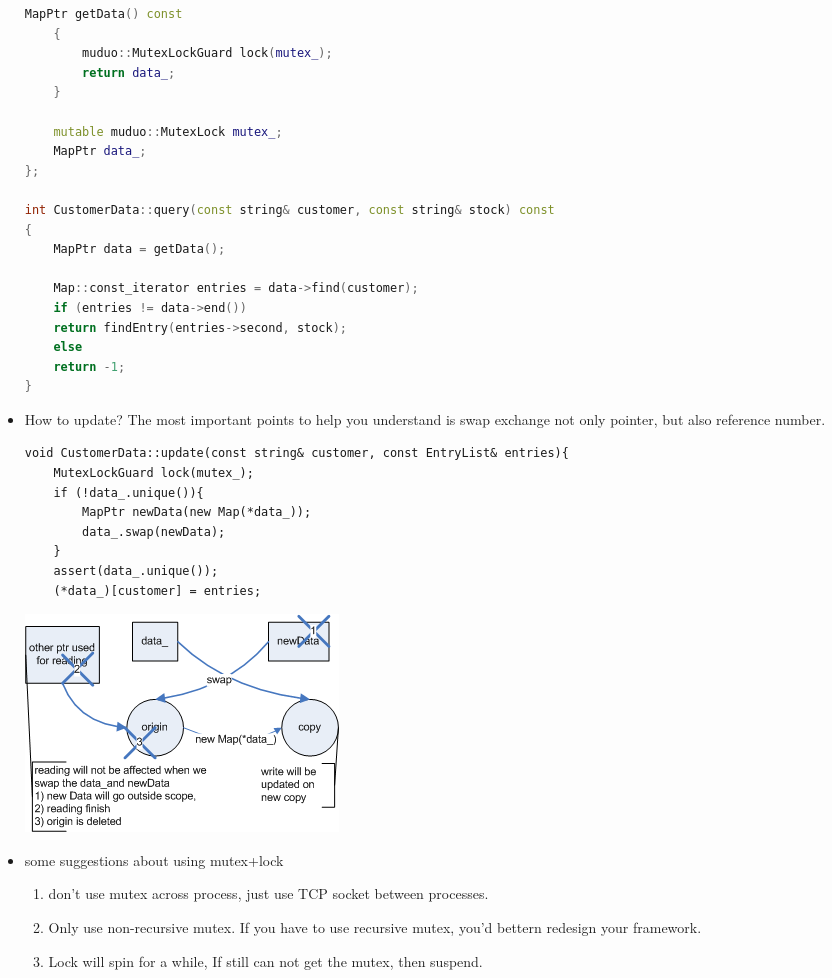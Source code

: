 \documentclass[a4paper,11pt,twoside]{book}
\begin{document}
\begin{itemize}
\begin{lstlisting}[frame=single, language=c++]
	MapPtr getData() const
	{
		muduo::MutexLockGuard lock(mutex_);
		return data_;
	}
	
	mutable muduo::MutexLock mutex_;
	MapPtr data_;
};

int CustomerData::query(const string& customer, const string& stock) const
{
	MapPtr data = getData();
	
	Map::const_iterator entries = data->find(customer);
	if (entries != data->end())
	return findEntry(entries->second, stock);
	else
	return -1;
}
\end{lstlisting}

\item How to update? The most important points to help you understand is swap exchange not only pointer, but also reference number. 
\begin{lstlisting}
void CustomerData::update(const string& customer, const EntryList& entries){
    MutexLockGuard lock(mutex_);
	if (!data_.unique()){
	    MapPtr newData(new Map(*data_));
		data_.swap(newData);
    }
	assert(data_.unique());
	(*data_)[customer] = entries;
\end{lstlisting}

\begin{center}
		\includegraphics[width=0.65\linewidth]{pics/read_copy.png}
\end{center}


    \item some suggestions about using mutex+lock
\begin{enumerate}
    \item don't use mutex across process, just use TCP socket between processes. 

    \item Only use non-recursive mutex. If you have to use recursive mutex, you'd bettern redesign your framework.

    \item Lock will spin for a while, If still can not get the mutex, then suspend.

\end{enumerate}

\end{itemize}
\end{document}

